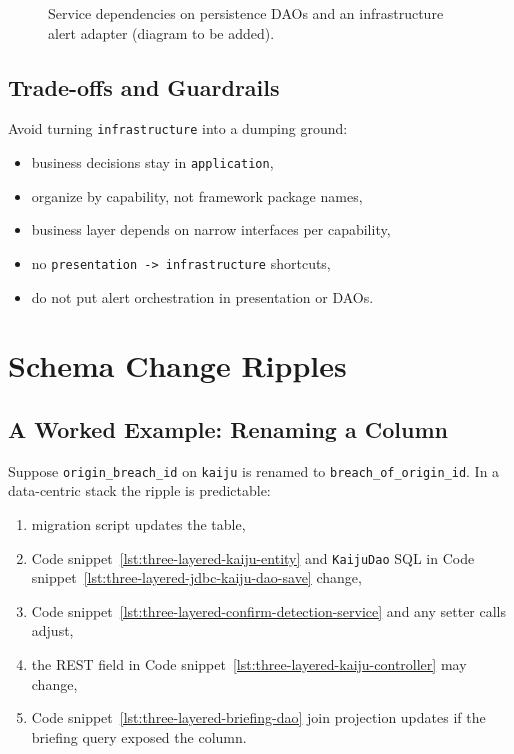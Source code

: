 \begin{figure}[htbp]
\centering
{}
\caption{Service dependencies on persistence DAOs and an infrastructure alert adapter (diagram to be added).}
\label{fig:three_layered_infrastructure_alert}
\end{figure}

\subsection{Trade-offs and Guardrails}
\label{sec:three_layered_persistence_to_infrastructure_tradeoffs}

Avoid turning \texttt{infrastructure} into a dumping ground:
\begin{itemize}
    \item business decisions stay in \texttt{application},
    \item organize by capability, not framework package names,
    \item business layer depends on narrow interfaces per capability,
    \item no \texttt{presentation -> infrastructure} shortcuts,
    \item do not put alert orchestration in presentation or DAOs.
\end{itemize}

\section{Schema Change Ripples}
\label{sec:three_layered_schema_ripples}

\subsection{A Worked Example: Renaming a Column}
\label{sec:three_layered_schema_ripple_example}

Suppose \texttt{origin\_breach\_id} on \texttt{kaiju} is renamed to \texttt{breach\_of\_origin\_id}. In a data-centric stack the ripple is predictable:
\begin{enumerate}
    \item migration script updates the table,
    \item Code snippet~\ref{lst:three-layered-kaiju-entity} and \texttt{KaijuDao} SQL in Code snippet~\ref{lst:three-layered-jdbc-kaiju-dao-save} change,
    \item Code snippet~\ref{lst:three-layered-confirm-detection-service} and any setter calls adjust,
    \item the REST field in Code snippet~\ref{lst:three-layered-kaiju-controller} may change,
    \item Code snippet~\ref{lst:three-layered-briefing-dao} join projection updates if the briefing query exposed the column.
\end{enumerate}

